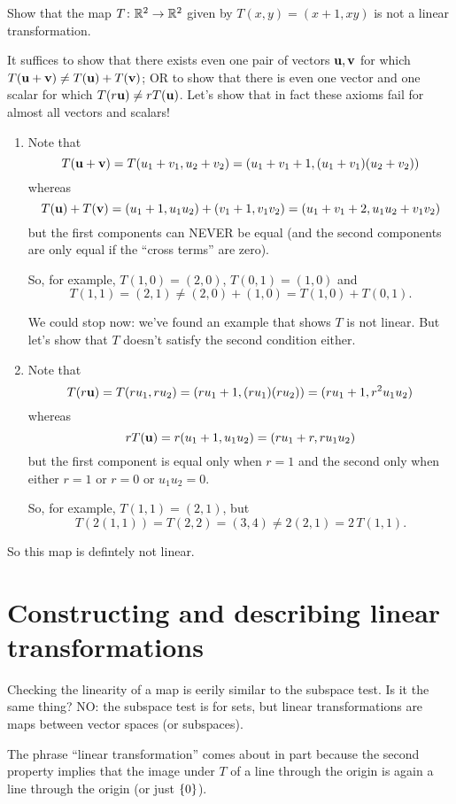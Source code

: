 \begin{myexample} Show that the map $T \colon \mathbb{R}^2 \to \mathbb{R}^2$ given by
$T(x,y) = (x+1, xy)$
is not a linear transformation.

It suffices to show that there exists even one pair of vectors $\mathbf{u},\mathbf{v}$
for which $T(\mathbf{u}+\mathbf{v}) \neq T(\mathbf{u})+T(\mathbf{v})$; OR to show that there is
even one vector and one scalar for which $T(r\mathbf{u}) \neq rT(\mathbf{u})$.
Let's show that in fact these axioms fail for almost all vectors
and scalars!

\begin{enumerate}
\item Note that $$T(\mathbf{u} + \mathbf{v}) = T(u_1+v_1,u_2+v_2) = (u_1+v_1+1, (u_1+v_1)(u_2+v_2))$$ whereas
$$
T(\mathbf{u}) + T(\mathbf{v}) = (u_1+1,u_1u_2) + (v_1+1, v_1v_2) = (u_1+v_1+2, u_1u_2+v_1v_2)
$$
but the first components can NEVER be equal (and the second components are only equal if the ``cross terms'' are zero).

So, for example, $T(1,0)=(2,0)$, $T(0,1)=(1,0)$ and $$T(1,1)=(2,1) \not=(2,0)+(1,0)=T(1,0) +T(0,1).$$

We could stop now: we've found an example that shows $T$ is not linear. But let's show that $T$ doesn't satisfy the second condition either.
\item Note that 
$$
T(r\mathbf{u}) = T(ru_1,ru_2) = (ru_1+1, (ru_1)(ru_2)) = (ru_1+1, r^2u_1u_2)
$$
whereas
$$
rT(\mathbf{u}) = r(u_1+1,u_1u_2) = (ru_1+r, ru_1u_2)
$$
but the first component is equal only when $r=1$ and the second only when
either $r=1$ or $r=0$ or $u_1u_2=0$. 

So, for example, $T(1,1)=(2,1)$, but $$T(2(1,1))=T(2,2)=(3, 4)\not= 2(2,1)=2\, T(1,1).$$
\end{enumerate}
So this map is defintely not linear.
\end{myexample}


\section{Constructing and describing linear transformations}

Checking the linearity of a map is eerily similar to the subspace test.  Is it the same thing?  NO: the
subspace test is for sets, but linear transformations are maps
between vector spaces (or subspaces).

The phrase ``linear transformation'' comes about in part because
the second property implies that the image under $T$ of a line
through the origin is again a line through the origin (or just $\{0 \}$).

